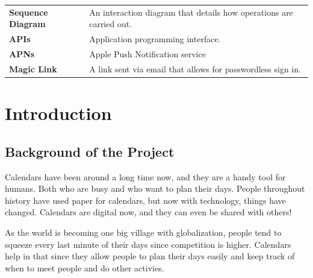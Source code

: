 \documentclass[12pt,a4paper]{report}
\begin{document}
\begin{singlespace}
\begin{center}
\begin{longtable}{p{}p{}}
            \textbf{Sequence Diagram} & An interaction diagram that details how operations are carried out.                                                                                        \\[1ex]

            \textbf{APIs}             & Application programming interface.                                                                                                                         \\[1ex]

            \textbf{APNs}             & Apple Push Notification service                                                                                                                            \\

            \textbf{Magic Link}       & A link sent via email that allows for passwordless sign in.                                                                                                \\

            \bottomrule
        \end{longtable}
    \end{center}

\end{singlespace}


\chapter{Introduction}


\section{Background of the Project}

Calendars have been around a long time now, and they are a handy tool for humans. Both who are busy and who want to plan their days. People throughout history have used paper for calendars, but now with technology, things have changed. Calendars are digital now, and they can even be shared with others!

As the world is becoming one big village with globalization, people tend to squeeze every last minute of their days since competition is higher. Calendars help in that since they allow people to plan their days easily and keep track of when to meet people and do other activies.
\end{document}
